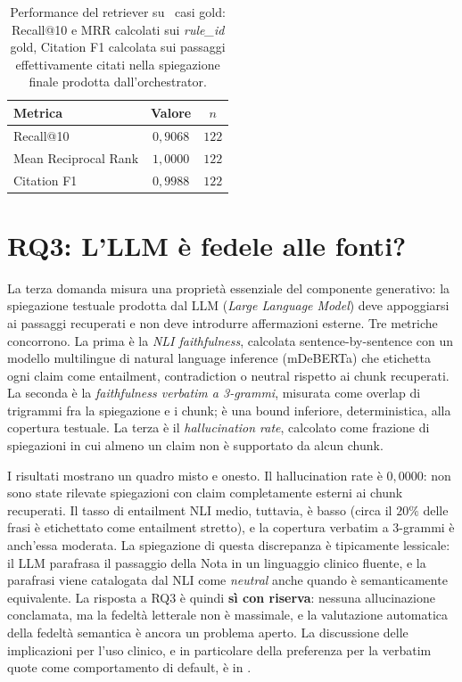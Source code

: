 \begin{table}[t]
  \centering
  \caption{Performance del retriever su \goldn\ casi gold: Recall@10 e MRR calcolati sui \emph{rule\_id} gold, Citation F1 calcolata sui passaggi effettivamente citati nella spiegazione finale prodotta dall'orchestrator.}
  \label{tab:retrieval}
  \small
  \begin{tabular}{lcc}
    \toprule
    Metrica & Valore & $n$ \\
    \midrule
    Recall@10           & $0{,}9068$ & $122$ \\
    Mean Reciprocal Rank& $1{,}0000$ & $122$ \\
    Citation F1         & $0{,}9988$ & $122$ \\
    \bottomrule
  \end{tabular}
\end{table}

\section{RQ3: L'LLM è fedele alle fonti?}
\label{sec:rq3}

La terza domanda misura una proprietà essenziale del componente generativo: la spiegazione testuale prodotta dal LLM (\emph{Large Language Model}) deve appoggiarsi ai passaggi recuperati e non deve introdurre affermazioni esterne. Tre metriche concorrono. La prima è la \emph{NLI faithfulness}, calcolata sentence-by-sentence con un modello multilingue di natural language inference (mDeBERTa) che etichetta ogni claim come entailment, contradiction o neutral rispetto ai chunk recuperati. La seconda è la \emph{faithfulness verbatim a 3-grammi}, misurata come overlap di trigrammi fra la spiegazione e i chunk; è una bound inferiore, deterministica, alla copertura testuale. La terza è il \emph{hallucination rate}, calcolato come frazione di spiegazioni in cui almeno un claim non è supportato da alcun chunk.

I risultati mostrano un quadro misto e onesto. Il hallucination rate è $0{,}0000$: non sono state rilevate spiegazioni con claim completamente esterni ai chunk recuperati. Il tasso di entailment NLI medio, tuttavia, è basso (circa il $20\%$ delle frasi è etichettato come entailment stretto), e la copertura verbatim a 3-grammi è anch'essa moderata. La spiegazione di questa discrepanza è tipicamente lessicale: il LLM parafrasa il passaggio della Nota in un linguaggio clinico fluente, e la parafrasi viene catalogata dal NLI come \emph{neutral} anche quando è semanticamente equivalente. La risposta a RQ3 è quindi \textbf{sì con riserva}: nessuna allucinazione conclamata, ma la fedeltà letterale non è massimale, e la valutazione automatica della fedeltà semantica è ancora un problema aperto. La discussione delle implicazioni per l'uso clinico, e in particolare della preferenza per la verbatim quote come comportamento di default, è in .

